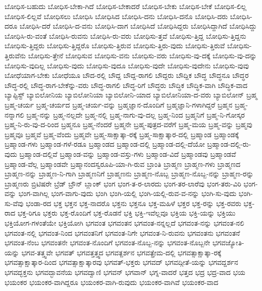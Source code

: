 {ಬೋಧಿಸ-ಬಹುದು
ಬೋಧಿಸ-ಬೇಕಾ-ಗಿದೆ
ಬೋಧಿಸ-ಬೇಕಾದರೆ
ಬೋಧಿಸ-ಬೇಕು
ಬೋಧಿಸ-ಬೇಕೆ
ಬೋಧಿಸ-ಲಿಲ್ಲ
ಬೋಧಿಸ-ಲಿಲ್ಲವೆ
ಬೋಧಿಸಲು
ಬೋಧಿಸಿ
ಬೋಧಿಸಿದ
ಬೋಧಿಸಿ-ದನು
ಬೋಧಿಸಿ-ದನೊ
ಬೋಧಿಸಿ-ದರು
ಬೋಧಿಸಿ-ದರೂ
ಬೋಧಿಸಿ-ದರೆ
ಬೋಧಿಸಿ-ದ-ವನು
ಬೋಧಿಸಿ-ದಾಗ
ಬೋಧಿಸಿದೆ
ಬೋಧಿಸಿದ್ದರು
ಬೋಧಿಸಿದ್ದಾಗಿದೆ
ಬೋಧಿಸಿದ್ದು
ಬೋಧಿಸಿ-ರು-ವಂತೆ
ಬೋಧಿಸಿ-ರುವನು
ಬೋಧಿಸಿ-ರು-ವರು
ಬೋಧಿಸು-ತ್ತವೆ
ಬೋಧಿಸು-ತ್ತಿದ್ದ
ಬೋಧಿಸು-ತ್ತಿದ್ದನು
ಬೋಧಿಸು-ತ್ತಿದ್ದರು
ಬೋಧಿಸು-ತ್ತಿದ್ದರೊ
ಬೋಧಿಸು-ತ್ತಿರುವ
ಬೋಧಿಸು-ತ್ತಿರು-ವುದು
ಬೋಧಿಸು-ತ್ತಿರುವೆ
ಬೋಧಿಸು-ತ್ತಿರುವೆನು
ಬೋಧಿಸು-ತ್ತೇನೆ
ಬೋಧಿಸುವ
ಬೋಧಿಸು-ವನು
ಬೋಧಿಸು-ವರು
ಬೋಧಿಸು-ವು-ದಕ್ಕೆ
ಬೋಧಿಸು-ವು-ದನ್ನು
ಬೋಧಿಸು-ವುದಿಲ್ಲ
ಬೋಧಿಸು-ವುದು
ಬೋಧಿಸು-ವುದೂ
ಬೋಧಿಸು-ವುದೇ
ಬೋಧಿಸು-ವುದೇನು
ಬೋಧಿಸು-ವುವು
ಬೋಧೆಯಾಗ-ಬೇಕು
ಬೋಧೆಯೂ
ಬೌದ-ರಲ್ಲಿ
ಬೌದ್ದ
ಬೌದ್ದ-ರಾಗಲಿ
ಬೌದ್ದರು
ಬೌದ್ದಿಕ
ಬೌದ್ಧ
ಬೌದ್ಧನೂ
ಬೌದ್ಧರ
ಬೌದ್ಧ-ರಲ್ಲಿ
ಬೌದ್ಧ-ರಾಗ-ಬೇಕೆನ್ನು-ವರು
ಬೌದ್ಧ-ರಾಗಲಿ
ಬೌದ್ಧ-ರಿಗೆ
ಬೌದ್ಧರು
ಬೌದ್ಧಿಕ
ಬೌದ್ಧಿಕ-ವಾಗಿ
ಬೌದ್ಧಿಕ-ವಾದ
ಬ್ಯಾಪ್ಟಿಸ್ಟ್
ಬ್ಯಾಬಿಲೋನಿಯ
ಬ್ಯಾಬಿಲೋನಿಯಾ
ಬ್ಯಾಬಿಲೋನಿ-ಯಾದ
ಬ್ಯಾಬಿಲೋನಿಯಾ-ದ-ವರು
ಬ್ಯಾಬಿಲೋನ್
ಬ್ರಹ್ಮ
ಬ್ರಹ್ಮ-ಚರ್ಯ
ಬ್ರಹ್ಮ-ಚರ್ಯದ
ಬ್ರಹ್ಮ-ಚರ್ಯ-ವನ್ನು
ಬ್ರಹ್ಮಜ್ಞಾನ-ದೊಂದಿಗೆ
ಬ್ರಹ್ಮಜ್ಞಾನಿ-ಗಳಾಗಿದ್ದರೆ
ಬ್ರಹ್ಮನ
ಬ್ರಹ್ಮ-ನನ್ನಾಗಲಿ
ಬ್ರಹ್ಮ-ನನ್ನು
ಬ್ರಹ್ಮ-ನಲ್ಲದೇ
ಬ್ರಹ್ಮ-ನಲ್ಲಿ
ಬ್ರಹ್ಮ-ನಾಗು-ವು-ದಲ್ಲ
ಬ್ರಹ್ಮ-ನಿಂದ
ಬ್ರಹ್ಮನಿಗೆ
ಬ್ರಹ್ಮ-ನಿ-ಗೋಸ್ಕರ
ಬ್ರಹ್ಮ-ನಿ-ರು-ವು-ದ-ರಿಂದ
ಬ್ರಹ್ಮನೂ
ಬ್ರಹ್ಮ-ನೆಂದರೆ
ಬ್ರಹ್ಮನೇ
ಬ್ರಹ್ಮ-ಪುತ್ರದ-ವರೆಗೆ
ಬ್ರಹ್ಮ-ಮಯ
ಬ್ರಹ್ಮ-ವನ್ನು
ಬ್ರಹ್ಮವು
ಬ್ರಹ್ಮವೂ
ಬ್ರಹ್ಮವೆ
ಬ್ರಹ್ಮ-ವೆಂದು
ಬ್ರಹ್ಮವೇ
ಬ್ರಹ್ಮ-ಸಾಕ್ಷಾತ್ಕಾ-ರಕ್ಕೆ
ಬ್ರಹ್ಮ-ಸಾಕ್ಷಾತ್ಕಾರ-ದಲ್ಲಿ
ಬ್ರಹ್ಮಾಂಡ
ಬ್ರಹ್ಮಾಂಡಕ್ಕೆ
ಬ್ರಹ್ಮಾಂಡ-ಗಳು
ಬ್ರಹ್ಮಾಂಡ-ಗಳೆ-ರಡೂ
ಬ್ರಹ್ಮಾಂಡದ
ಬ್ರಹ್ಮಾಂಡ-ದಲ್ಲಿ
ಬ್ರಹ್ಮಾಂಡ-ದಲ್ಲಿ-ದೆಯೋ
ಬ್ರಹ್ಮಾಂಡ-ದಲ್ಲಿ-ರು-ವುದು
ಬ್ರಹ್ಮಾಂಡ-ದಲ್ಲಿವೆ
ಬ್ರಹ್ಮಾಂಡ-ವನ್ನು
ಬ್ರಹ್ಮಾಂಡ-ವಸ್ತು-ಗಳು
ಬ್ರಹ್ಮಾಂಡ-ವಿದೆ
ಬ್ರಹ್ಮಾಂಡವು
ಬ್ರಹ್ಮಾಂಡವೆ
ಬ್ರಹ್ಮಾಂಡ-ವೆಲ್ಲ
ಬ್ರಹ್ಮಾಂಡವೇ
ಬ್ರಹ್ಮಾನಂದಸ್ವರೂಪಿ-ಯಾ-ಗಿ-ರುವ
ಬ್ರಾಂತಿ
ಬ್ರಾಹ್ಮಣ
ಬ್ರಾಹ್ಮಣ-ಗಳು
ಬ್ರಾಹ್ಮಣದ
ಬ್ರಾಹ್ಮಣ-ನನ್ನು
ಬ್ರಾಹ್ಮಣ-ನಿ-ಗಾಗಿ
ಬ್ರಾಹ್ಮಣನಿಗೆ
ಬ್ರಾಹ್ಮಣನು
ಬ್ರಾಹ್ಮಣ-ನೊಬ್ಬ
ಬ್ರಾಹ್ಮಣ-ನೊಬ್ಬ-ನನ್ನು
ಬ್ರಾಹ್ಮಣ-ರನ್ನು
ಬ್ರಾಹ್ಮಣರು
ಬ್ರಿಟಿಷರೇ
ಬ್ರೆಡ್
ಬ್ರೌನ್
ಬ್ಲಾಂಕ್
ಭಂಗ
ಭಂಗ-ತ-ರ-ಲಾರದು
ಭಂಗ-ತರ-ಲಾರೆವು
ಭಂಗ-ತರು-ವಿರಿ
ಭಂಗ-ವನ್ನು
ಭಂಗ-ವಾಗಿಲ್ಲ
ಭಂಗ-ವಾಗು-ವುದು
ಭಂಗಿ
ಭಂಗಿ-ಯಲ್ಲಿ
ಭಂಗಿ-ಯಲ್ಲಿ-ರುವ-ವ-ನನ್ನು
ಭಂಗಿ-ಸು-ವುದು
ಭಂಗಿ-ಸು-ವೆವು
ಭಂಡಾ-ರದ
ಭಕ್ತ
ಭಕ್ತನ
ಭಕ್ತ-ನಾದರೊ
ಭಕ್ತನು
ಭಕ್ತನೂ
ಭಕ್ತ-ಮಹಿಳೆ
ಭಕ್ತರ
ಭಕ್ತ-ರನ್ನು
ಭಕ್ತ-ರವರು
ಭಕ್ತ-ರಾದ
ಭಕ್ತ-ರಿಗೂ
ಭಕ್ತರು
ಭಕ್ತ-ರೊಂದಿಗೆ
ಭಕ್ತ-ರೊಡನೆ
ಭಕ್ತಿ
ಭಕ್ತಿ-ಇವೆಲ್ಲವೂ
ಭಕ್ತಿಯ
ಭಕ್ತಿ-ಯನ್ನು
ಭಕ್ತಿಯು
ಭಕ್ತಿಯೋಗ-ಗಳಂತೆಯೇ
ಭಕ್ತಿಯೋಗಿ
ಭಗವಂತ
ಭಗವಂತನ
ಭಗವಂತ-ನನ್ನಲ್ಲದೆ
ಭಗವಂತ-ನನ್ನು
ಭಗವಂತ-ನಲಿ
ಭಗವಂತ-ನಲ್ಲಿ
ಭಗವಂತ-ನಿಂದ
ಭಗವಂತನಿಗೆ
ಭಗವಂತ-ನಿಗೇ
ಭಗವಂತ-ನಿ-ರುವನು
ಭಗವಂತನು
ಭಗವಂತನೆ
ಭಗವಂತ-ನೆಂಬ
ಭಗವಂತನೇ
ಭಗವಂತ-ನೊಂದಿಗೆ
ಭಗವಂತ-ನೊಬ್ಬ-ನನ್ನು
ಭಗವಂತ-ನೊಬ್ಬನೇ
ಭಗವಜ್ಯೋತಿ-ಯನ್ನು
ಭಗವ-ತತ್ತ್ವವೇ
ಭಗವತ್
ಭಗವತ್ತತ್ತ್ವದ
ಭಗವತ್ದರ್ಶನ
ಭಗವತ್ಪ್ರೇಮ-ದಲ್ಲಿ
ಭಗವತ್ಸಾಕ್ಷಾತ್ಕಾ-ರಕ್ಕೆ
ಭಗವತ್ಸಾಕ್ಷಾತ್ಕಾರ-ದಿಂದ
ಭಗವತ್ಸಾಕ್ಷಾತ್ಕಾರವು
ಭಗವತ್-ಭಕ್ತರು
ಭಗವದ್
ಭಗವದ್ಗೀತೆ-ಯನ್ನು
ಭಗವದ್ದರ್ಶನ
ಭಗವದ್ಭಕ್ತನು
ಭಗವದ್ಭಾವನೆಯ
ಭಗವದ್ವಾಣಿ
ಭಗವನ್
ಭಗವಾನ್
ಭಗ್ನ-ವಾದರೆ
ಭತ್ತದ
ಭದ್ರ
ಭದ್ರ-ವಾದ
ಭಯ
ಭಯಂಕರ
ಭಯಂಕರ-ವಾಗಿದ್ದರೂ
ಭಯಂಕರ-ವಾಗಿ-ರುವುದು
ಭಯಂಕರ-ವಾಗಿವೆ
ಭಯಂಕರ-ವಾದ
}
